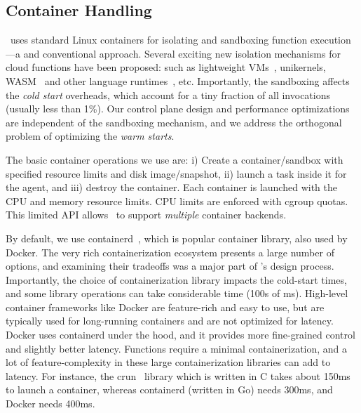 \subsection{Container Handling}
\label{sec:design:ctr}

\sysname~uses standard Linux containers for isolating and sandboxing function execution---a  and conventional approach.  
Several exciting new isolation mechanisms for cloud functions
have been proposed: such as lightweight VMs~\cite{firecracker-nsdi20}, unikernels, WASM~\cite{shillaker2020faasm} and other language runtimes~\cite{graalvm}, etc. 
Importantly, the sandboxing affects the \emph{cold start} overheads, which account for a tiny fraction of all invocations (usually less than 1\%).
Our control plane design and performance optimizations are independent of the sandboxing mechanism, and we address the orthogonal problem of optimizing the \emph{warm starts}. 

The basic container operations we use are: i) Create a container/sandbox with specified resource limits and disk image/snapshot, ii) launch a task inside it for the agent, and iii) destroy the container.
Each container is launched with the CPU and memory resource limits. CPU limits are enforced with cgroup quotas. 
This limited API allows \sysname~to support \emph{multiple} container backends.


By default, we use containerd~\cite{containerd}, which is popular container library, also used by Docker. 
The very rich containerization ecosystem presents a large number of options, and examining their tradeoffs was a major part of \sysname's design process.
Importantly, the choice of containerization library impacts the cold-start times, and some library operations can take considerable time (100s of ms). 
High-level container frameworks like Docker are feature-rich and easy to use, but are typically used for long-running containers and are not optimized for latency.
Docker uses containerd under the hood, and it provides  more fine-grained control and slightly better latency.
Functions require a minimal containerization, and a lot of feature-complexity in these large containerization libraries can add to latency.
For instance, the crun~\cite{crun} library which is written in C takes about 150ms to launch a container, whereas containerd (written in Go) needs 300ms, and Docker needs 400ms. 

